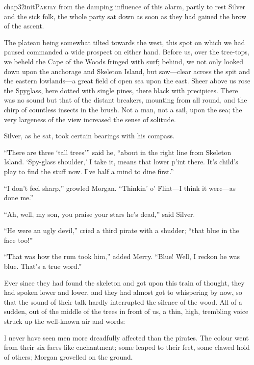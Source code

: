 
   \lettrine[lines=4,image=true]{chap32initP}{artly} from the damping influence of this alarm, partly to rest Silver and the sick folk, the whole party sat down as soon as they had gained the brow of the ascent.

The plateau being somewhat tilted towards the west, this spot on which we had paused commanded a wide prospect on either hand. Before us, over the tree-tops, we beheld the Cape of the Woods fringed with surf; behind, we not only looked down upon the anchorage and Skeleton Island, but saw---clear across the spit and the eastern lowlands---a great field of open sea upon the east. Sheer above us rose the Spyglass, here dotted with single pines, there black with precipices. There was no sound but that of the distant breakers, mounting from all round, and the chirp of countless insects in the brush. Not a man, not a sail, upon the sea; the very largeness of the view increased the sense of solitude.

Silver, as he sat, took certain bearings with his compass.

\enquote{There are three ‘tall trees’} said he, \enquote{about in the right line from Skeleton Island. ‘Spy-glass shoulder,’ I take it, means that lower p’int there. It’s child’s play to find the stuff now. I’ve half a mind to dine first.}

\enquote{I don’t feel sharp,} growled Morgan. \enquote{Thinkin’ o’ Flint---I think it were---as done me.}

\enquote{Ah, well, my son, you praise your stars he’s dead,} said Silver.

\enquote{He were an ugly devil,} cried a third pirate with a shudder; \enquote{that blue in the face too!}

\enquote{That was how the rum took him,} added Merry. \enquote{Blue! Well, I reckon he was blue. That’s a true word.}

Ever since they had found the skeleton and got upon this train of thought, they had spoken lower and lower, and they had almost got to whispering by now, so that the sound of their talk hardly interrupted the silence of the wood. All of a sudden, out of the middle of the trees in front of us, a thin, high, trembling voice struck up the well-known air and words:

\shortyoho

I never have seen men more dreadfully affected than the pirates. The colour went from their six faces like enchantment; some leaped to their feet, some clawed hold of others; Morgan grovelled on the ground.


